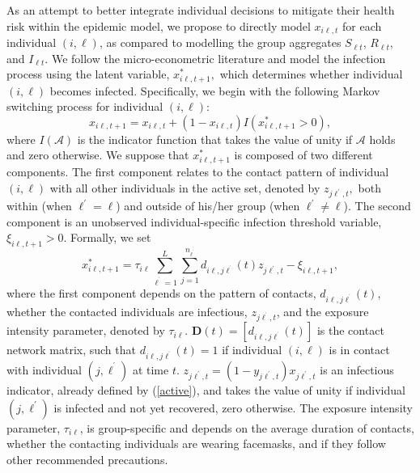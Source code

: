 \documentclass[12pt]{article}
\begin{document}
As an attempt to better integrate individual decisions to mitigate their
health risk within the epidemic model, we propose to directly model
$x_{i\ell,t}$ for each individual $(i,\ell)$, as compared to modelling the
group aggregates $S_{\ell t}$, $R_{\ell t}$, and $I_{\ell t}$. We follow the
micro-econometric literature and model the infection process using the latent
variable, $x_{i\ell,t+1}^{\ast},$ which determines whether individual
$(i,\ell)$ becomes infected. Specifically, we begin with the following Markov
switching process for individual $(i,\ell)$:%
\begin{equation}
x_{i\ell,t+1}=x_{i\ell,t}+\left(  1-x_{i\ell,t}\right)  I\left(  x_{i\ell
,t+1}^{\ast}>0\right)  , \label{xil+}%
\end{equation}
where $I\left(  \mathcal{A}\right)  $ is the indicator function that takes the
value of unity if $\mathcal{A}$ holds and zero otherwise. We suppose that
$x_{i\ell,t+1}^{\ast}$ is composed of two different components. The first
component relates to the contact pattern of individual $(i,\ell)$ with all
other individuals in the active set, denoted by $z_{j\ell^{\prime},t},$ both
within (when $\ell^{\prime}=\ell$) and outside of his/her group (when
$\ell^{\prime}\neq\ell$). The second component is an unobserved
individual-specific infection threshold variable, $\xi_{i\ell,t+1}>0$.
Formally, we set%
\begin{equation}
x_{i\ell,t+1}^{\ast}=\tau_{i\ell}\sum_{\ell^{^{\prime}}=1}^{L}\sum
_{j=1}^{n_{\ell^{^{\prime}}}}d_{i\ell,j\ell^{^{\prime}}}\left(  t\right)
z_{j\ell^{\prime},t}-\xi_{i\ell,t+1}, \label{xstar}%
\end{equation}
where the first component depends on the pattern of contacts, $d_{i\ell
,j\ell^{^{\prime}}}\left(  t\right)  $, whether the contacted individuals are
infectious, $z_{j\ell^{^{\prime}},t}$, and the exposure intensity parameter,
denoted by $\tau_{i\ell}$. $\mathbf{D}(t)=\left[  d_{i\ell,j\ell^{^{\prime}}%
}\left(  t\right)  \right]  $ is the contact network matrix, such that
$d_{i\ell,j\ell^{^{\prime}}}\left(  t\right)  =1$ if individual $\left(
i,\ell\right)  $ is in contact with individual $\left(  j,\ell^{^{\prime}%
}\right)  $ at time $t.$ $z_{j\ell^{\prime},t}=\left(  1-y_{j\ell^{\prime}%
,t}\right)  x_{j\ell^{\prime},t}$ is an infectious indicator, already defined
by (\ref{active}), and takes the value of unity if individual $\left(
j,\ell^{\prime}\right)  $ is infected and not yet recovered, zero otherwise.
The exposure intensity parameter, $\tau_{i\ell}$, is group-specific and
depends on the average duration of contacts, whether the contacting
individuals are wearing facemasks, and if they follow other recommended precautions.
\end{document}
